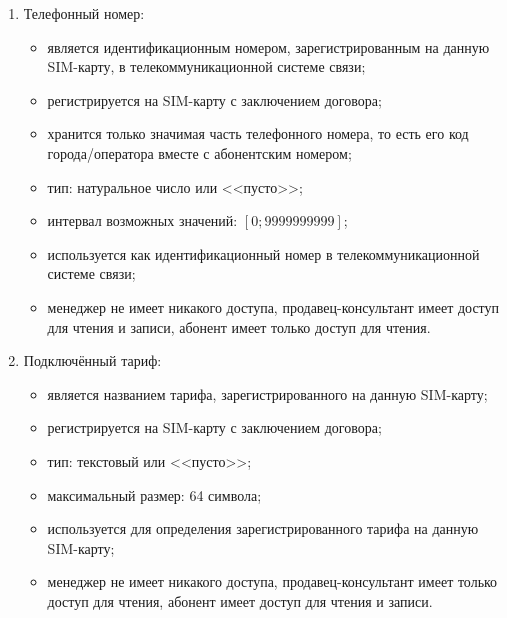 \begin{enumerate}
\begin{enumerate}
        \item Телефонный номер:
        \begin{itemize}
            \item является идентификационным номером, зарегистрированным на данную SIM-карту, в телекоммуникационной системе связи;
            \item регистрируется на SIM-карту с заключением договора;
            \item хранится только значимая часть телефонного номера, то есть его код города/оператора вместе с абонентским номером; 
            \item тип: натуральное число или <<пусто>>;
            \item интервал возможных значений: $[0; 9 999 999 999]$;
            \item используется как идентификационный номер в телекоммуникационной системе связи;
            \item менеджер не имеет никакого доступа, продавец-консультант имеет доступ для чтения и записи, абонент имеет только доступ для чтения.
        \end{itemize}

        \item Подключённый тариф:
        \begin{itemize}
            \item является названием тарифа, зарегистрированного на данную SIM-карту;
            \item регистрируется на SIM-карту с заключением договора;
            \item тип: текстовый или <<пусто>>;
            \item максимальный размер: 64 символа; %
            \item используется для определения зарегистрированного тарифа на данную SIM-карту;
            \item менеджер не имеет никакого доступа, продавец-консультант имеет только доступ для чтения, абонент имеет доступ для чтения и записи.
        \end{itemize}
    \end{enumerate}


\end{enumerate}
